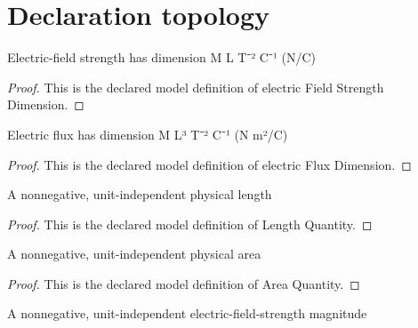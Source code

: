 \section{Declaration topology}
\begin{definition}
  \label{def:physics:phyx-mini-0998:phyxminiproblems-problemphyxmini0998-electricfieldstrengthdimension}
  Electric-field strength has dimension M L T⁻² C⁻¹ (N/C)
\end{definition}
\begin{proof}
  This is the declared model definition of electric Field Strength Dimension.
\end{proof}
\begin{definition}
  \label{def:physics:phyx-mini-0998:phyxminiproblems-problemphyxmini0998-electricfluxdimension}
  Electric flux has dimension M L³ T⁻² C⁻¹ (N m²/C)
\end{definition}
\begin{proof}
  This is the declared model definition of electric Flux Dimension.
\end{proof}
\begin{definition}
  \label{def:physics:phyx-mini-0998:phyxminiproblems-problemphyxmini0998-lengthquantity}
  A nonnegative, unit-independent physical length
\end{definition}
\begin{proof}
  This is the declared model definition of Length Quantity.
\end{proof}
\begin{definition}
  \label{def:physics:phyx-mini-0998:phyxminiproblems-problemphyxmini0998-areaquantity}
  A nonnegative, unit-independent physical area
\end{definition}
\begin{proof}
  This is the declared model definition of Area Quantity.
\end{proof}
\begin{definition}
  \label{def:physics:phyx-mini-0998:phyxminiproblems-problemphyxmini0998-electricfieldstrengthmagnitude}
  A nonnegative, unit-independent electric-field-strength magnitude
\end{definition}
